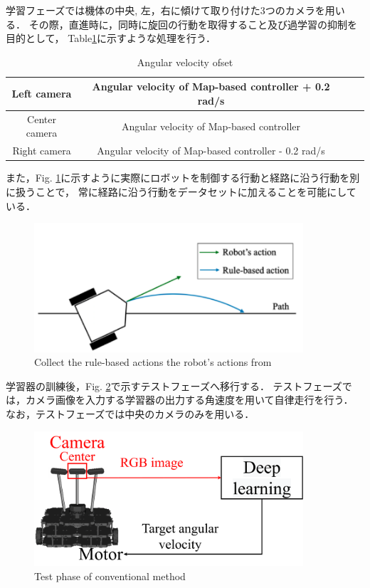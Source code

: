 \newpage
学習フェーズでは機体の中央, 左，右に傾けて取り付けた3つのカメラを用いる．
その際，直進時に，同時に旋回の行動を取得すること及び過学習の抑制を目的として，
Table\ref{tb::camera_ang}に示すような処理を行う．
\begin{table}[H]
    \centering
    \caption{Angular velocity ofset}
    \begin{tabular}{|c|c|ll}
    \hline
    Left camera   & Angular velocity of Map-based controller + 0.2 rad/s \\ \hline
    Center camera & Angular velocity of Map-based controller             \\ \hline
    Right camera  & Angular velocity of Map-based controller - 0.2 rad/s  \\ \hline
    \end{tabular}
    \label{tb::camera_ang}
    \end{table}
また，Fig. \ref{fig::okada_path}に示すように実際にロボットを制御する行動と経路に沿う行動を別に扱うことで，
常に経路に沿う行動をデータセットに加えることを可能にしている．
\begin{figure}[h]
    \centering
    \includegraphics[width = 10cm]{./figs/okada_path.png}
    \caption{Collect the rule-based actions the robot's actions from \cite{okada}}
    \label{fig::okada_path}
\end{figure}

\newpage
学習器の訓練後，Fig. \ref{fig::okada_method_test}で示すテストフェーズへ移行する．
テストフェーズでは，カメラ画像を入力する学習器の出力する角速度を用いて自律走行を行う．
なお，テストフェーズでは中央のカメラのみを用いる．
\begin{figure}[h]
    \centering
    \includegraphics[width = 10cm]{./figs/okada_method_test.pdf}
    \caption{Test phase of conventional method}
    \label{fig::okada_method_test}
\end{figure}